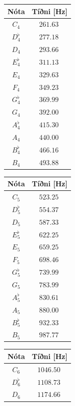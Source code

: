 \begin{table}[H]
\begin{center}
\begin{tabular}{|c|c|}
\hline
\textbf{Nóta} & \textbf{Tíðni [Hz]} \\
\hline
\hline
$C_4$ & $\SI{261.63}{}$ \\
$D^\flat_4$ & $\SI{277.18}{}$ \\
$D_4$ & $\SI{293.66}{}$ \\
$E^\flat_4$ & $\SI{311.13}{}$ \\
$E_4$ & $\SI{329.63}{}$ \\
$F_4$ & $\SI{349.23}{}$ \\
$G^\flat_4$ & $\SI{369.99}{}$ \\
$G_4$ & $\SI{392.00}{}$ \\
$A^\flat_4$ & $\SI{415.30}{}$ \\
$A_4$ & $\SI{440.00}{}$ \\
$B^\flat_4$ & $\SI{466.16}{}$ \\
$B_4$ & $\SI{493.88}{}$ \\
\hline
\end{tabular}
\quad
\begin{tabular}{|c|c|}
\hline
\textbf{Nóta} & \textbf{Tíðni [Hz]} \\
\hline
\hline
$C_5$ & $\SI{523.25}{}$ \\
$D^\flat_5$ & $\SI{554.37}{}$ \\
$D_5$ & $\SI{587.33}{}$ \\
$E^\flat_5$ & $\SI{622.25}{}$ \\
$E_5$ & $\SI{659.25}{}$ \\
$F_5$ & $\SI{698.46}{}$ \\
$G^\flat_5$ & $\SI{739.99}{}$ \\
$G_5$ & $\SI{783.99}{}$ \\
$A^\flat_5$ & $\SI{830.61}{}$ \\
$A_5$ & $\SI{880.00}{}$ \\
$B^\flat_5$ & $\SI{932.33}{}$ \\
$B_5$ & $\SI{987.77}{}$ \\
\hline
\end{tabular}
\quad
\begin{tabular}{|c|c|}
\hline
\textbf{Nóta} & \textbf{Tíðni [Hz]} \\
\hline
\hline
$C_6$ & $\SI{1046.50}{}$ \\
$D^\flat_6$ & $\SI{1108.73}{}$ \\
$D_6$ & $\SI{1174.66}{}$ \\

\end{tabular}
\end{center}
\end{table}
